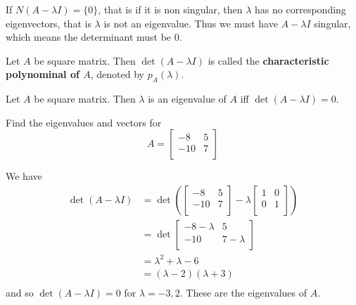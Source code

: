 \documentclass{article}
\begin{document}
\begin{remark}
  If $N(A - \lambda I) = \{0\}$, that is if it is non singular, then $\lambda$ has no corresponding eigenvectors, that is $\lambda$ is not an eigenvalue. Thus we must have $A - \lambda I$ singular, which means the determinant must be $0$.
\end{remark}
\begin{definition}
  Let $A$ be square matrix. Then $\det (A - \lambda I)$ is called the \textbf{characteristic polynominal of $A$}, denoted by $p_A(\lambda)$.
\end{definition}
\begin{theorem}
  Let $A$ be square matrix. Then $\lambda$ is an eigenvalue of $A$ iff $\det(A - \lambda I) = 0$.
\end{theorem}
\begin{example}
  Find the eigenvalues and vectors for \[
    A =
    \begin{bmatrix}
      -8  & 5 \\
      -10 & 7 \\
    \end{bmatrix}
  \]

  We have
  \begin{align*}
    \det (A - \lambda I) & = \det \left(
    \begin{bmatrix}
      -8  & 5 \\
      -10 & 7 \\
    \end{bmatrix} - \lambda
    \begin{bmatrix}
      1 & 0 \\
      0 & 1 \\
    \end{bmatrix}\right)                                \\
                         & = \det
    \begin{bmatrix}
      -8 - \lambda & 5           \\
      -10          & 7 - \lambda \\
    \end{bmatrix}                          \\
                         & = \lambda^2 + \lambda - 6    \\
                         & = (\lambda - 2)(\lambda + 3) \\
  \end{align*}
  and so $\det(A - \lambda I) = 0$ for $\lambda = -3, 2$. These are the eigenvalues of $A$.


\end{example}
\end{document}
